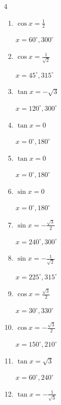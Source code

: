 \begin{multicols}{4}
\begin{enumerate}
  \item $\displaystyle \cos{x}  = \frac{1}{2}$

        $\displaystyle x = 60^{\circ} , 300^{\circ}$

  \item $\displaystyle \cos{x}  = \frac{1}{\sqrt{2}}$

        $\displaystyle x = 45^{\circ} , 315^{\circ}$

  \item $\displaystyle \tan{x}  = -\sqrt{3}$

        $\displaystyle x = 120^{\circ} , 300^{\circ}$

\columnbreak %

  \item $\displaystyle \tan{x}  = 0$

        $\displaystyle x = 0^{\circ} , 180^{\circ}$

  \item $\displaystyle \tan{x}  = 0$

        $\displaystyle x = 0^{\circ} , 180^{\circ}$

  \item $\displaystyle \sin{x}  = 0$

        $\displaystyle x = 0^{\circ} , 180^{\circ}$

  \item $\displaystyle \sin{x}  = -\frac{\sqrt{3}}{2}$

        $\displaystyle x = 240^{\circ} , 300^{\circ}$

  \item $\displaystyle \sin{x}  = -\frac{1}{\sqrt{2}}$

        $\displaystyle x = 225^{\circ} , 315^{\circ}$

  \item $\displaystyle \cos{x}  = \frac{\sqrt{3}}{2}$

        $\displaystyle x = 30^{\circ} , 330^{\circ}$

  \item $\displaystyle \cos{x}  = -\frac{\sqrt{3}}{2}$

        $\displaystyle x = 150^{\circ} , 210^{\circ}$

  \item $\displaystyle \tan{x}  = \sqrt{3}$

        $\displaystyle x = 60^{\circ} , 240^{\circ}$

  \item $\displaystyle \tan{x}  = -\frac{1}{\sqrt{3}}$


\end{enumerate}
\end{multicols}
